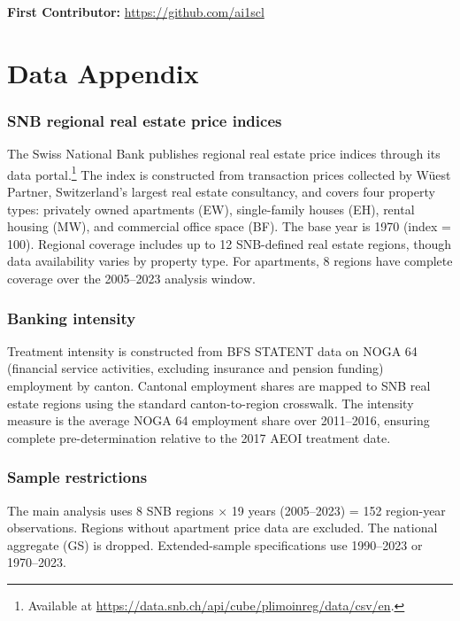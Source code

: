 \documentclass[12pt]{article}
\begin{document}
\noindent\textbf{First Contributor:} \url{https://github.com/ai1scl}

\label{apep_main_text_end}
\newpage


\newpage
\appendix

\section{Data Appendix}

\subsubsection*{SNB regional real estate price indices} The Swiss National Bank publishes regional real estate price indices through its data portal.\footnote{Available at \url{https://data.snb.ch/api/cube/plimoinreg/data/csv/en}.} The index is constructed from transaction prices collected by W\"uest Partner, Switzerland's largest real estate consultancy, and covers four property types: privately owned apartments (EW), single-family houses (EH), rental housing (MW), and commercial office space (BF). The base year is 1970 (index = 100). Regional coverage includes up to 12 SNB-defined real estate regions, though data availability varies by property type. For apartments, 8 regions have complete coverage over the 2005--2023 analysis window.

\subsubsection*{Banking intensity} Treatment intensity is constructed from BFS STATENT data on NOGA 64 (financial service activities, excluding insurance and pension funding) employment by canton. Cantonal employment shares are mapped to SNB real estate regions using the standard canton-to-region crosswalk. The intensity measure is the average NOGA 64 employment share over 2011--2016, ensuring complete pre-determination relative to the 2017 AEOI treatment date.

\subsubsection*{Sample restrictions} The main analysis uses 8 SNB regions $\times$ 19 years (2005--2023) = 152 region-year observations. Regions without apartment price data are excluded. The national aggregate (GS) is dropped. Extended-sample specifications use 1990--2023 or 1970--2023.
\end{document}
